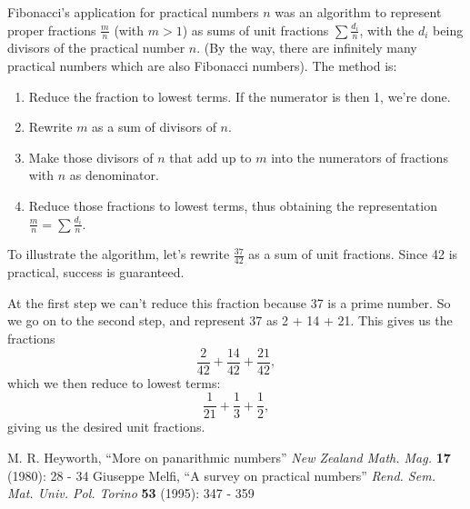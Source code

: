 \documentclass[12pt]{article}
\begin{document}
Fibonacci's application for practical numbers $n$ was an algorithm to represent proper fractions $\frac{m}{n}$ (with $m > 1$) as sums of unit fractions $\displaystyle \sum \frac{d_i}{n}$, with the $d_i$ being divisors of the practical number $n$. (By the way, there are infinitely many practical numbers which are also Fibonacci numbers). The method is:

\begin{enumerate}
\item Reduce the fraction to lowest terms. If the numerator is then 1, we're done.
\item Rewrite $m$ as a sum of divisors of $n$.
\item Make those divisors of $n$ that add up to $m$ into the numerators of fractions with $n$ as denominator.
\item Reduce those fractions to lowest terms, thus obtaining the representation $\displaystyle \frac{m}{n} = \sum \frac{d_i}{n}$.
\end{enumerate}

To illustrate the algorithm, let's rewrite $\frac{37}{42}$ as a sum of unit fractions. Since 42 is practical, success is guaranteed. 

At the first step we can't reduce this fraction because 37 is a prime number. So we go on to the second step, and represent 37 as 2 + 14 + 21. This gives us the fractions $$\frac{2}{42} + \frac{14}{42} + \frac{21}{42},$$ which we then reduce to lowest terms: $$\frac{1}{21} + \frac{1}{3} + \frac{1}{2},$$ giving us the desired unit fractions.

\begin{thebibliography}{2}
  M. R. Heyworth, ``More on panarithmic numbers'' {\it New Zealand Math. Mag.} {\bf 17} (1980): 28 - 34
 Giuseppe Melfi, ``A survey on practical numbers'' {\it Rend. Sem. Mat. Univ. Pol. Torino} {\bf 53} (1995): 347 - 359
\end{thebibliography}
\end{document}
